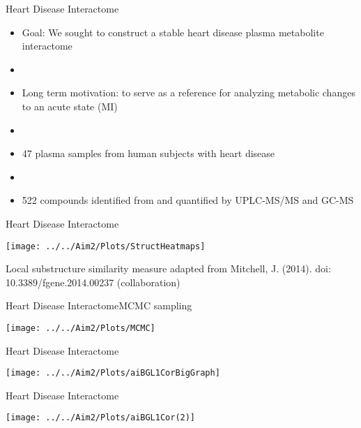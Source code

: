 \documentclass[xcolor=dvipsnames]{beamer}
\begin{document}
\begin{frame}{Heart Disease Interactome}
	\vspace{-15.5pt}
	\begin{itemize}
		\item Goal: We sought to construct a stable heart disease plasma metabolite interactome \pause
		\item[]
		\item Long term motivation:  to serve as a reference for analyzing metabolic changes to an acute state (MI) \pause
		\item[]
		\item 47 plasma samples from human subjects with heart disease \pause
		\item[]
		\item 522 compounds identified from and quantified by UPLC-MS/MS and GC-MS
	\end{itemize}
\end{frame}

\begin{frame}{Heart Disease Interactome}
		\vspace{-15.5pt}
	\begin{center}
		\texttt{[image: ../../Aim2/Plots/StructHeatmaps]}
		
		Local substructure similarity measure adapted from Mitchell, J. (2014). doi: 10.3389/fgene.2014.00237 (collaboration)
	\end{center}
\end{frame}

\begin{frame}{Heart Disease Interactome}{MCMC sampling}
	\vspace{-10.5pt}
	\begin{center}
		\texttt{[image: ../../Aim2/Plots/MCMC]}
	\end{center}
\end{frame}

\begin{frame}{Heart Disease Interactome}
	\vspace{-10.5pt}
	\begin{center}
		\texttt{[image: ../../Aim2/Plots/aiBGL1CorBigGraph]}
	\end{center}
\end{frame}

\begin{frame}{Heart Disease Interactome}
	\vspace{-10.5pt}
	\begin{center}
		\texttt{[image: ../../Aim2/Plots/aiBGL1Cor(2)]}
	\end{center}
\end{frame}
\end{document}
